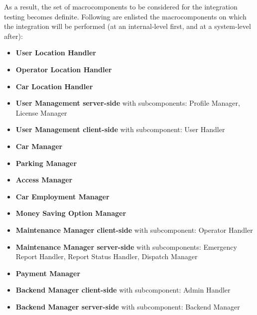 	As a result, the set of macrocomponents to be considered for the integration testing becomes definite. Following are enlisted the macrocomponents on which the integration will be performed (at an internal-level first, and at a system-level after):
	\begin{itemize}
		\item \textbf{User Location Handler}
		\item \textbf{Operator Location Handler}
		\item \textbf{Car Location Handler}
		\item \textbf{User Management server-side} with subcomponents: Profile Manager, License Manager
		\item \textbf{User Management client-side} with subcomponent: User Handler
		\item \textbf{Car Manager}
		\item \textbf{Parking Manager}
		\item \textbf{Access Manager}
		\item \textbf{Car Employment Manager}
		\item \textbf{Money Saving Option Manager}
		\item \textbf{Maintenance Manager client-side} with subcomponent: Operator Handler
		\item \textbf{Maintenance Manager server-side} with subcomponents: Emergency Report Handler, Report Status Handler, Dispatch Manager
		\item \textbf{Payment Manager}
		\item \textbf{Backend Manager client-side} with subcomponent: Admin Handler
		\item \textbf{Backend Manager server-side} with subcomponent: Backend Manager		
	\end{itemize}
	

